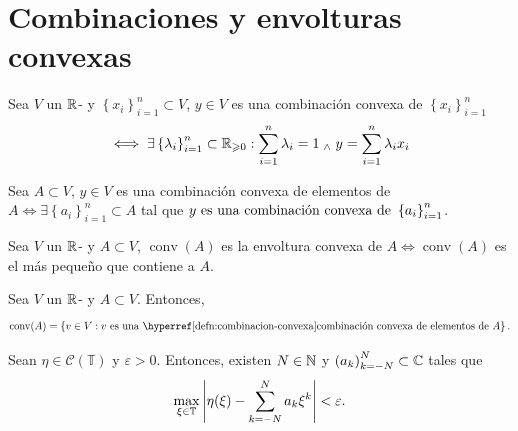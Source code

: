 \section{Combinaciones y envolturas convexas}

\begin{defn}\label{defn:combinacion-convexa}
    Sea $V$ un $\mathbb{R}$- y $\left\{x_i\right\}_{i=1}^n \subset V$, $y \in V$ es una combinación convexa de $\left\{x_i\right\}_{i=1}^n$
    \[
    \iff \exists \left\{\lambda_i\right\}_{i=1}^n \subset \mathbb{R}_{\geqslant 0} : \sum_{i=1}^n \lambda_i = 1 \; _{\wedge} \; y = \sum_{i=1}^n \lambda_i x_i
    \]

    Sea $A \subset V$, $y \in V$ es una combinación convexa de elementos de $A \iff \exists \left\{a_i\right\}_{i=1}^n \subset A$ tal que $y \text{ es una combinación convexa de } \left\{a_i\right\}_{i=1}^n$.
\end{defn}

\begin{defn}\label{defn:envoltura-convexa}
    Sea $V$ un $\mathbb{R}$- y $A \subset V$, $\operatorname{conv}(A)$ es la envoltura convexa de $A \iff \operatorname{conv}(A)$ es el  más pequeño que contiene a $A$.
\end{defn}

\begin{prop}\label{prop:envoltura-convexa-combinacion-convexa}
    Sea $V$ un $\mathbb{R}$- y $A \subset V$. Entonces,
    \[
    \operatorname{conv}(A) = \left\{v \in V : v \tex{ es una \exhyperref[defn:combinacion-convexa]{combinacion-convexa}{combinación convexa} de elementos de } A \right\}.
    \]
\end{prop}


\begin{teo}\label{teo:stone-weierstrass-toro}
    Sean $\eta \in \mathcal{C}(\mathbb{T})$ y $\varepsilon > 0$. Entonces, existen $N \in \mathbb{N}$ y $\left(a_k\right)_{k=-N}^N \subset \mathbb{C}$ tales que
    \[
    \max_{\xi \in \mathbb{T}} \left|\eta(\xi) - \sum_{k=-N}^N a_k \xi^k\right| < \varepsilon.
    \]
\end{teo}